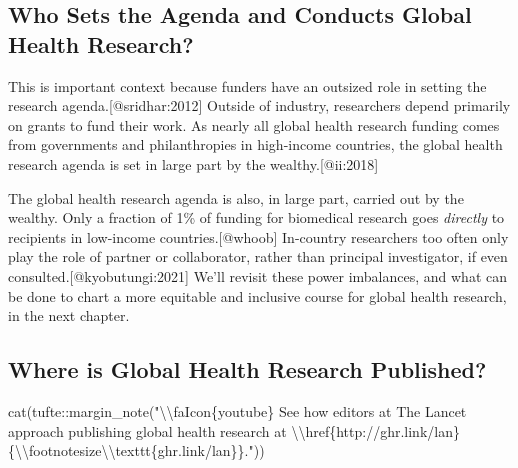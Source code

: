 \documentclass[
  letterpaper,
  DIV=11,
  numbers=noendperiod,
  oneside]{scrartcl}
\newenvironment{Shaded}{\begin{snugshade}}{\end{snugshade}}
\newcommand{\FunctionTok}[1]{\textcolor[rgb]{0.28,0.35,0.67}{#1}}
\newcommand{\NormalTok}[1]{\textcolor[rgb]{0.00,0.23,0.31}{#1}}
\newcommand{\SpecialCharTok}[1]{\textcolor[rgb]{0.37,0.37,0.37}{#1}}
\newcommand{\StringTok}[1]{\textcolor[rgb]{0.13,0.47,0.30}{#1}}
\begin{document}
\hypertarget{who-sets-the-agenda-and-conducts-global-health-research}{%
\subsection{Who Sets the Agenda and Conducts Global Health
Research?}\label{who-sets-the-agenda-and-conducts-global-health-research}}

This is important context because funders have an outsized role in
setting the research agenda.{[}@sridhar:2012{]} Outside of industry,
researchers depend primarily on grants to fund their work. As nearly all
global health research funding comes from governments and philanthropies
in high-income countries, the global health research agenda is set in
large part by the wealthy.{[}@ii:2018{]}

The global health research agenda is also, in large part, carried out by
the wealthy. Only a fraction of 1\% of funding for biomedical research
goes \emph{directly} to recipients in low-income countries.{[}@whoob{]}
In-country researchers too often only play the role of partner or
collaborator, rather than principal investigator, if even
consulted.{[}@kyobutungi:2021{]} We'll revisit these power imbalances,
and what can be done to chart a more equitable and inclusive course for
global health research, in the next chapter.

\hypertarget{where-is-global-health-research-published}{%
\subsection{Where is Global Health Research
Published?}\label{where-is-global-health-research-published}}

\begin{Shaded}
\begin{Highlighting}[]
\FunctionTok{cat}\NormalTok{(tufte}\SpecialCharTok{::}\FunctionTok{margin\_note}\NormalTok{(}\StringTok{"}\SpecialCharTok{\textbackslash{}\textbackslash{}}\StringTok{faIcon\{youtube\} See how editors at The Lancet approach publishing global health research at }\SpecialCharTok{\textbackslash{}\textbackslash{}}\StringTok{href\{http://ghr.link/lan\}\{}\SpecialCharTok{\textbackslash{}\textbackslash{}}\StringTok{footnotesize}\SpecialCharTok{\textbackslash{}\textbackslash{}}\StringTok{texttt\{ghr.link/lan\}\}."}\NormalTok{))}
\end{Highlighting}
\end{Shaded}

\end{document}
